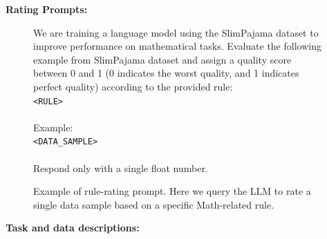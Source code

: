 \documentclass{article}
\newcommand{\mytiny}{\fontsize{8pt}{10pt}\selectfont}
\begin{document}
\textbf{Rating Prompts:}
\begin{figure}[H]
\centering
\small
\begin{tcolorbox}[colback=cyan!10!white, %
                  colframe=cyan!30!white, %
                  width=0.99\textwidth, %
                  arc=4mm, %
                  auto outer arc,
                  ]
We are training a language model using the SlimPajama dataset to improve performance on mathematical tasks. Evaluate the following example from SlimPajama dataset and assign a quality score between 0 and 1 (0 indicates the worst quality, and 1 indicates perfect quality) according to the provided rule:\\
\texttt{\color{red}<RULE>}\\
\\
Example:\\
\texttt{\color{red}<DATA\_SAMPLE>}\\\\
Respond only with a single float number.
\end{tcolorbox}
\caption{Example of rule-rating prompt. Here we query the LLM to rate a single data sample based on a specific Math-related rule.}
\label{tab:rule_rating_prompt}
\end{figure}

\textbf{Task and data descriptions:}
\begingroup
\mytiny
\end{document}
